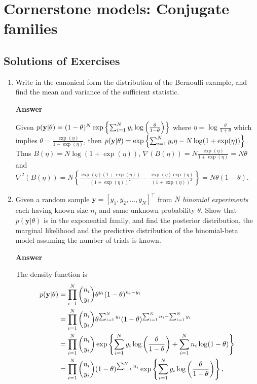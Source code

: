 \chapter{Cornerstone models: Conjugate families}\label{chap4}

\section{Solutions of Exercises}\label{sec1}
\begin{enumerate}[leftmargin=*]
\item Write in the canonical form the distribution of the Bernoulli example, and find the mean and variance of the sufficient statistic.

\textbf{Answer}

Given $p({\bf{y}}|\theta)=(1-\theta)^N\exp\left\{\sum_{i=1}^N y_i\log\left(\frac{\theta}{1-\theta}\right)\right\}$ where $\eta=\log\frac{\theta}{1+\theta}$ which implies $\theta=\frac{\exp(\eta)}{1-\exp(\eta)}$, then $p({\bf{y}}|\theta)=\exp\left\{\sum_{i=1}^N y_i\eta-N\log(1+\exp(\eta))\right\}$. Thus $B(\eta)=N\log(1+\exp(\eta))$, $\nabla(B(\eta))=N\frac{\exp(\eta)}{1+\exp(\eta)}=N\theta$ and $\nabla^2(B(\eta))=N\left\{\frac{\exp(\eta)(1+\exp(\eta))}{(1+\exp(\eta))^2}-\frac{\exp(\eta)\exp(\eta)}{(1+\exp(\eta))^2}\right\}=N\theta(1-\theta)$. 



\item Given a random sample $\mathbf{y}=[y_1,y_2,\dots,y_N]^{\top}$ from $N$ \textit{binomial experiments} each having known size $n_i$ and same unknown probability $\theta$. Show that $p(\mathbf{y}|\theta)$ is in the exponential family, and find the posterior distribution, the marginal likelihood and the predictive distribution of the binomial-beta model assuming the number of trials is known.

\textbf{Answer}

The density function is 
\begin{align*}
p({\bf{y}}|\theta)&=\prod_{i=1}^N{n_i \choose y_i}\theta^{y_i}(1-\theta)^{n_i-y_i}\\
&=\prod_{i=1}^N{n_i \choose y_i}\theta^{\sum_{i=1}^Ny_i}(1-\theta)^{\sum_{i=1}^N n_i-\sum_{i=1}^N y_i}\\
&=\prod_{i=1}^N{n_i \choose y_i}\exp\left\{\sum_{i=1}^N y_i\log\left(\frac{\theta}{1-\theta}\right)+\sum_{i=1}^N n_i\log(1-\theta)\right\}\\
&=\prod_{i=1}^N{n_i \choose y_i}(1-\theta)^{\sum_{i=1}^N n_i}\exp\left\{\sum_{i=1}^N y_i\log\left(\frac{\theta}{1-\theta}\right)\right\},
\end{align*}
 

\end{enumerate}
